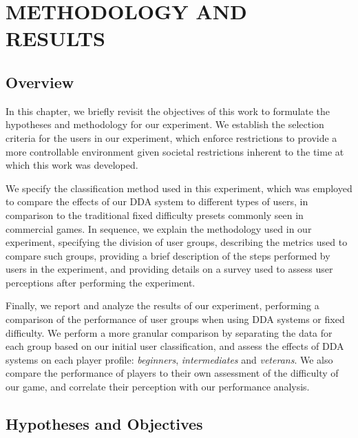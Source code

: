 \chapter{METHODOLOGY AND RESULTS}
\label{ch:methodology-results}

\section{Overview}

In this chapter, we briefly revisit the objectives of this work to formulate the hypotheses and methodology for our experiment. We establish the selection criteria for the users in our experiment, which enforce restrictions to provide a more controllable environment given societal restrictions inherent to the time at which this work was developed.

We specify the classification method used in this experiment, which was employed to compare the effects of our DDA system to different types of users, in comparison to the traditional fixed difficulty presets commonly seen in commercial games. In sequence, we explain the methodology used in our experiment, specifying the division of user groups, describing the metrics used to compare such groups, providing a brief description of the steps performed by users in the experiment, and providing details on a survey used to assess user perceptions after performing the experiment.

Finally, we report and analyze the results of our experiment, performing a comparison of the performance of user groups when using DDA systems or fixed difficulty. We perform a more granular comparison by separating  the data for each group based on our initial user classification, and assess the effects of DDA systems on each player profile: \emph{beginners}, \emph{intermediates} and \emph{veterans}. We also compare the performance of players to their own assessment of the difficulty of our game, and correlate their perception with our performance analysis.


\section{Hypotheses and Objectives}
\label{sec:hypotheses-and-objectives}

